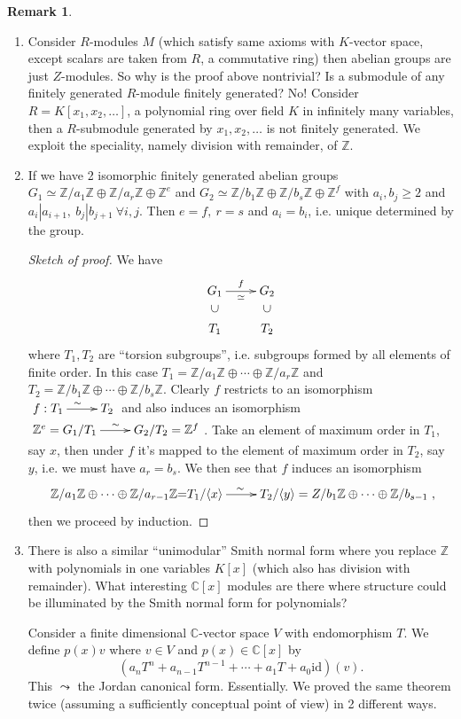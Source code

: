 \documentclass[a4paper]{article}
\theoremstyle{definition}
\newtheorem*{remark}{Remark}
\begin{document}
\begin{remark}
\begin{enumerate}
    \item Consider $R$-modules $M$ (which satisfy same axioms with $K$-vector space, except scalars are taken from $R$, a commutative ring) then abelian groups are just $Z$-modules. So why is the proof above nontrivial? Is a submodule of any finitely generated $R$-module finitely generated? No! Consider $R=K[x_1,x_2,\ldots]$, a polynomial ring over field $K$ in infinitely many variables, then a $R$-submodule generated by $x_1,x_2,\ldots$ is not finitely generated. We exploit the speciality, namely division with remainder, of $\mathbb Z$.
    \item If we have 2 isomorphic finitely generated abelian groups $G_1 \simeq \mathbb Z/a_1\mathbb Z\oplus \mathbb Z/a_r\mathbb Z \oplus \mathbb Z^e$ and $G_2 \simeq \mathbb Z/b_1\mathbb Z\oplus \mathbb Z/b_s\mathbb Z \oplus \mathbb Z^f$ with $a_i,b_j\geq 2$ and $a_i|a_{i+1},\ b_j|b_{j+1} \ \forall i,j$. Then $e=f,\ r=s$ and $a_i=b_i$, i.e. unique determined by the group.
    \begin{proof}[Sketch of proof] We have
    \[
    \xymatrix@R=0.1pc{G_1 \ar[r]_{\simeq}^f & G_2 \\
    \rotatebox{90}{$\subset$} & \rotatebox{90}{$\subset$} \\
    T_1 & T_2
    }
    \]
    where $T_1,T_2$ are ``torsion subgroups'', i.e. subgroups formed by all elements of finite order. In this case $T_1=\mathbb Z/a_1\mathbb Z\oplus \cdots \oplus \mathbb Z/a_r\mathbb Z$ and $T_2=\mathbb Z/b_1\mathbb Z\oplus \cdots \oplus\mathbb Z/b_s\mathbb Z$. Clearly $f$ restricts to an isomorphism $\xymatrix{
    f:T_1 \ar[r]^\sim &T_2
    }$ and also induces an isomorphism $\xymatrix{
    \mathbb Z^e=G_1/T_1 \ar[r]^\sim &G_2/T_2=\mathbb Z^f
    }$. Take an element of maximum order in $T_1$, say $x$, then under $f$ it's mapped to the element of maximum order in $T_2$, say $y$, i.e. we must have $a_r=b_s$. We then see that $f$ induces an isomorphism
    \[
    \xymatrix{
    \mathbb Z/a_1 \mathbb Z \oplus \cdots \oplus \mathbb Z/a_{r-1} \mathbb Z \mathbb =T_1/\langle x\rangle \ar[r]^\sim &T_2/\langle y\rangle=\mathbb \mathbb Z/b_1 \mathbb Z \oplus \cdots \oplus \mathbb Z/b_{s-1}
    },
    \]
    then we proceed by induction.
    \end{proof}
    \item There is also a similar ``unimodular'' Smith normal form where you replace $\mathbb Z$ with polynomials in one variables $K[x]$ (which also has division with remainder). What interesting $\mathbb C[x]$ modules are there where structure could be illuminated by the Smith normal form for polynomials?

    Consider a finite dimensional $\mathbb C$-vector space $V$ with endomorphism $T$. We define $p(x)v$ where $v\in V$ and $p(x)\in \mathbb C[x]$ by
    \[
    \left(a_n T^n + a_{n-1} T^{n-1}+\cdots + a_1 T+a_0 \text{id} \right)(v).
    \]
    This $\leadsto$ the Jordan canonical form. Essentially. We proved the same theorem twice (assuming a sufficiently conceptual point of view) in 2 different ways.
\end{enumerate}
\end{remark}
\end{document}
